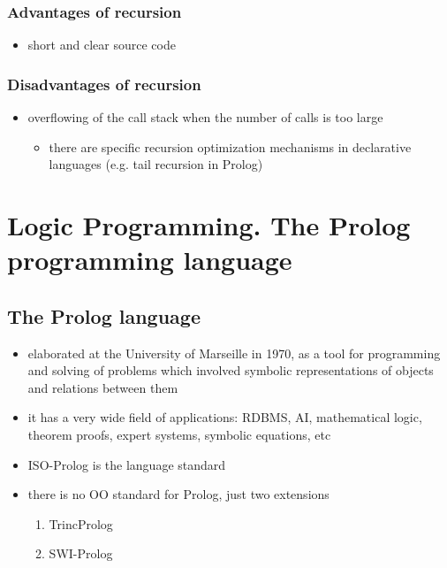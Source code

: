 \documentclass[11pt]{article}
\begin{document}
\subsubsection{Advantages of recursion}
\label{sec:org248014d}
\begin{itemize}
\item short and clear source code
\end{itemize}
\subsubsection{Disadvantages of recursion}
\label{sec:org8081429}
\begin{itemize}
\item overflowing of the call stack when the number of calls is too large
\begin{itemize}
\item there are specific recursion optimization mechanisms in declarative languages (e.g. tail recursion in Prolog)
\end{itemize}
\end{itemize}
\section{Logic Programming. The Prolog programming language}
\label{sec:orgef8f171}
\subsection{The Prolog language}
\label{sec:orgf15de2e}
\begin{itemize}
\item elaborated at the University of Marseille in 1970, as a tool for programming and solving of problems which involved symbolic representations of objects and relations between them
\item it has a very wide field of applications: RDBMS, AI, mathematical logic, theorem proofs, expert systems, symbolic equations, etc
\item ISO-Prolog is the language standard
\item there is no OO standard for Prolog, just two extensions
\begin{enumerate}
\item TrincProlog
\item SWI-Prolog
\end{enumerate}
\end{itemize}
\end{document}
